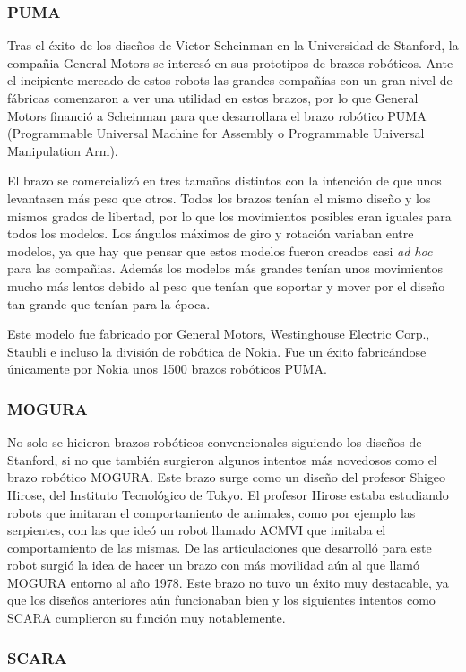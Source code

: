 \subsubsection{PUMA}

Tras el éxito de los diseños de Victor Scheinman en la Universidad de Stanford, la compañia General Motors se interesó en sus prototipos de brazos robóticos. Ante el incipiente mercado de estos robots las grandes compañías con un gran nivel de fábricas comenzaron a ver una utilidad en estos brazos, por lo que General Motors financió a Scheinman para que desarrollara el brazo robótico PUMA (Programmable Universal Machine for Assembly o Programmable Universal Manipulation Arm).

El brazo se comercializó en tres tamaños distintos con la intención de que unos levantasen más peso que otros. Todos los brazos tenían el mismo diseño y los mismos grados de libertad, por lo que los movimientos posibles eran iguales para todos los modelos. Los ángulos máximos de giro y rotación variaban entre modelos, ya que hay que pensar que estos modelos fueron creados casi \textit{ad hoc} para las compañias. Además los modelos más grandes tenían unos movimientos mucho más lentos debido al peso que tenían que soportar y mover por el diseño tan grande que tenían para la época.

Este modelo fue fabricado por General Motors, Westinghouse Electric Corp., Staubli e incluso la división de robótica de Nokia. Fue un éxito fabricándose únicamente por Nokia unos 1500 brazos robóticos PUMA.

\subsubsection{MOGURA}

No solo se hicieron brazos robóticos convencionales siguiendo los diseños de Stanford, si no que también surgieron algunos intentos más novedosos como el brazo robótico MOGURA. Este brazo surge como un diseño del profesor Shigeo Hirose, del Instituto Tecnológico de Tokyo. El profesor Hirose estaba estudiando robots que imitaran el comportamiento de animales, como por ejemplo las serpientes, con las que ideó un robot llamado ACMVI que imitaba el comportamiento de las mismas. De las articulaciones que desarrolló para este robot surgió la idea de hacer un brazo con más movilidad aún al que llamó MOGURA entorno al año 1978. Este brazo no tuvo un éxito muy destacable, ya que los diseños anteriores aún funcionaban bien y los siguientes intentos como SCARA cumplieron su función muy notablemente.

\subsubsection{SCARA}
